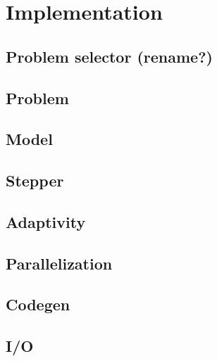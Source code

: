 \documentclass{ansarticle}
\begin{document}
\section{Implementation}
\subsection{Problem selector (rename?)}

\subsection{Problem}
\subsection{Model}
\subsection{Stepper}

\subsection{Adaptivity}
\subsection{Parallelization}
\subsection{Codegen}
\subsection{I/O}





\end{document}
